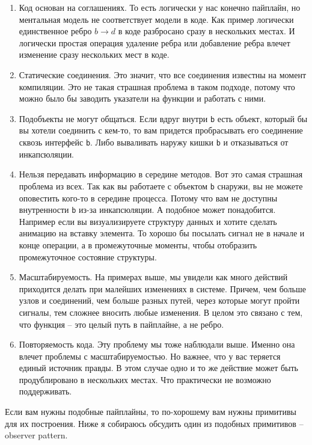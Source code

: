 \begin{enumerate}
\item Код основан на соглашениях.
То есть логически у нас конечно пайплайн, но ментальная модель не соответствует модели в коде.
Как пример логически единственное ребро $b\to d$ в коде разбросано сразу в нескольких местах.
И логически простая операция удаление ребра или добавление ребра влечет изменение сразу нескольких мест в коде.

\item Статические соединения.
Это значит, что все соединения известны на момент компиляции.
Это не такая страшная проблема в таком подходе, потому что можно было бы заводить указатели на функции и работать с ними.

\item Подобъекты не могут общаться.
Если вдруг внутри \verb"b" есть объект, который бы вы хотели соединить с кем-то, то вам придется пробрасывать его соединение сквозь интерфейс \verb"b".
Либо вываливать наружу кишки \verb"b" и отказываться от инкапсюляции.

\item Нельзя передавать информацию в середине методов.
Вот это самая страшная проблема из всех.
Так как вы работаете с объектом \verb"b" снаружи, вы не можете оповестить кого-то в середине процесса.
Потому что вам не доступны внутренности \verb"b" из-за инкапсюляции.
А подобное может понадобится.
Например если вы визуализируете структуру данных и хотите сделать анимацию на вставку элемента.
То хорошо бы посылать сигнал не в начале и конце операции, а в промежуточные моменты, чтобы отобразить промежуточное состояние структуры.

\item Масштабируемость.
На примерах выше, мы увидели как много действий приходится делать при малейших изменениях в системе.
Причем, чем больше узлов и соединений, чем больше разных путей, через которые могут пройти сигналы, тем сложнее вносить любые изменения.
В целом это связано с тем, что функция -- это целый путь в пайплайне, а не ребро.

\item Повторяемость кода.
Эту проблему мы тоже наблюдали выше.
Именно она влечет проблемы с масштабируемостью.
Но важнее, что у вас теряется единый источник правды.
В этом случае одно и то же действие может быть продублировано в нескольких местах.
Что практически не возможно поддерживать.
\end{enumerate}
Если вам нужны подобные пайплайны, то по-хорошему вам нужны примитивы для их построения.
Ниже я собираюсь обсудить один из подобных примитивов -- observer pattern.

